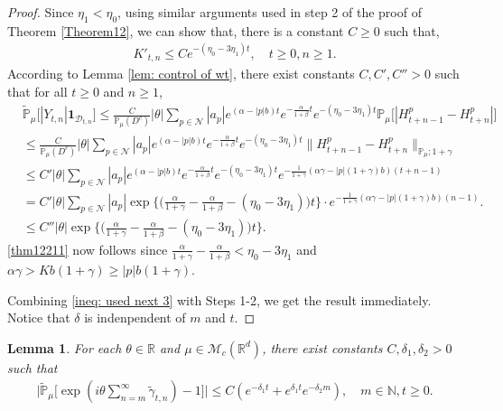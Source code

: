 \documentclass[12pt,a4paper]{amsart}
\theoremstyle{plain}
\newtheorem{lem}[thm]{Lemma}
\theoremstyle{definition}
\numberwithin{equation}{section}
\begin{document}
\begin{proof}
Since $\eta_1 < \eta_0$,  using similar arguments used in  step 2 of the proof of Theorem \ref{Theorem12},
we can show that, there is a constant $C\geq 0$ such that,
\begin{align}
\label{ineq: control of Kkt1}
     K'_{t,n}
     \leq C e^{-(\eta_0 - 3\eta_1) t},
     \quad t \geq 0, n\geq 1.
\end{align}
   According to Lemma \ref{lem: control of wt},
    there exist constants $C,C',C''>0$ such that  for all $t\geq 0$ and $n\geq 1$,
    \begin{align}\label{ineq:used next 2}
        &\tilde{\mathbb{P}}_{\mu}\big[|Y_{t,n}|\mathbf{1}_{\mathcal{D}_{t,n}}\big]\leq \frac{C}{\mathbb{P}_{\mu}(D^c)} |\theta|\sum_{p\in\mathcal{N}}|a_p|e^{(\alpha-|p|b)t}e^{-\frac{\alpha}{1+\beta}t}e^{-(\eta_0-3\eta_1)t}\mathbb{P}_{\mu}\Big[|H_{t+n-1}^p-H_{t+n}^p|\Big]\\
        &\leq \frac{C}{\mathbb{P}_{\mu}(D^c)} |\theta|\sum_{p\in\mathcal{N}}|a_p|e^{(\alpha-|p|b)t}e^{-\frac{\alpha}{1+\beta}t}e^{-(\eta_0-3\eta_1)t}\|H_{t+n-1}^p-H_{t+n}^p\|_{\mathbb{P}_{\mu};1+\gamma}
        \\&\leq C' |\theta|\sum_{p\in\mathcal{N}}|a_p|e^{(\alpha-|p|b)t}e^{-\frac{\alpha}{1+\beta}t}e^{-(\eta_0-3\eta_1)t}e^{-\frac{1}{1+\gamma}(\alpha\gamma-|p|(1+\gamma)b)(t+n-1)}\\
        &=C'|\theta|\sum_{p\in\mathcal{N}}|a_p|\exp\Big\{\Big(\frac{\alpha}{1+\gamma}-\frac{\alpha}{1+\beta}-(\eta_0-3\eta_1)\Big)t\Big\}\cdot e^{-\frac{1}{1+\gamma}(\alpha\gamma-|p|(1+\gamma)b)(n-1)}.\\
        &\leq C''|\theta|\exp\Big\{\Big(\frac{\alpha}{1+\gamma}-\frac{\alpha}{1+\beta}-(\eta_0-3\eta_1)\Big)t\Big\}.
    \end{align}
    \eqref{thm12211} now follows  since $\frac{\alpha}{1+\gamma}-\frac{\alpha}{1+\beta}<\eta_0-3\eta_1$ and $\alpha\gamma>Kb(1+\gamma)\geq |p|b(1+\gamma)$.
  
 Combining \eqref{ineq: used next 3} with Steps 1-2, we get the result immediately. Notice that $\delta$ is indenpendent of $m$ and $t$.
\end{proof}
\begin{lem}\label{lem: lemma05}
For each $\theta\in \mathbb{R}$ and $\mu \in \mathcal{M}_c(\mathbb{R}^d)$, there exist constants $C,\delta_1,\delta_2>0$ such that
\begin{align}
  \Big|\tilde{\mathbb{P}}_{\mu}\Big[\exp(i\theta \sum_{n=m}^{\infty}\tilde{\gamma}_{t,n})-1\Big]\Big|\leq C(e^{-\delta_1 t}+e^{\delta_1 t}e^{-\delta_2 m}),\quad m\in \mathbb{N}, t\geq 0.
\end{align}
\end{lem}
\end{document}
